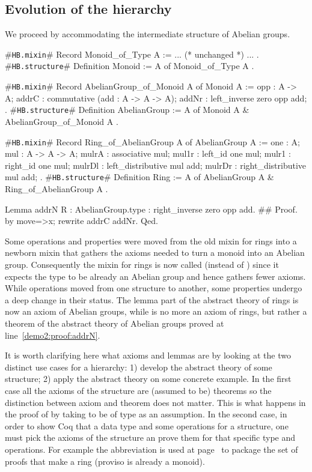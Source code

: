 \documentclass[a4paper,UKenglish,cleveref, autoref]{lipics-v2019}
\newcommand{\mixin}{mixin}
\newcommand{\phantterm}{abbreviation}
\newcommand{\hbmixin}{{\tt\color{dkgreen}HB.mixin}}
\newcommand{\hbstructure}{{\tt\color{dkgreen}HB.structure}}
\theoremstyle{implem}
\theoremstyle{implem}
\theoremstyle{command}
\theoremstyle{commands}
\begin{document}
\subsection{Evolution of the hierarchy}\label{subsec:evolution}

We proceed by accommodating the intermediate
structure of Abelian groups.

\begin{coqcode}
#\hbmixin{}# Record Monoid_of_Type A := { ... (* unchanged *) ... }.
#\hbstructure{}# Definition Monoid := { A of Monoid_of_Type A }.

#\hbmixin{}# Record AbelianGroup_of_Monoid A of Monoid A := {
  opp : A -> A;
  addrC : commutative (add : A -> A -> A);
  addNr : left_inverse zero opp add;
}.
#\hbstructure{}# Definition AbelianGroup := { A of Monoid A & AbelianGroup_of_Monoid A }.

#\hbmixin{}# Record Ring_of_AbelianGroup A of AbelianGroup A := {
  one : A;
  mul : A -> A -> A;
  mulrA : associative mul;
  mul1r : left_id one mul;              mulr1 : right_id one mul;
  mulrDl : left_distributive mul add;   mulrDr : right_distributive mul add;
}.
#\hbstructure{}# Definition Ring := { A of AbelianGroup A & Ring_of_AbelianGroup A }.

Lemma addrN {R : AbelianGroup.type} : right_inverse zero opp add.               #\label{demo2:proof:addrN}#
Proof. by move=>x; rewrite addrC addNr. Qed.
\end{coqcode}

Some operations and properties were moved from the old \mixin{} for rings
into a newborn \mixin{}  that gathers the
axioms needed to turn a monoid into an Abelian group. Consequently the \mixin{}
for rings is now called  (instead of )
since it expects the type  to be already an Abelian group and hence
gathers fewer axioms.
While operations moved from one structure to another, some properties
undergo a deep change in their status.
The lemma  part of the abstract theory of
rings is now an axiom of Abelian groups, while  is no more
an axiom of rings, but rather a theorem of the abstract theory of Abelian
groups proved at line~\ref{demo2:proof:addrN}.

It is worth clarifying here what axioms and lemmas are by looking at the
two distinct use cases for a hierarchy: 1) develop the abstract theory of some
structure; 2) apply the abstract theory on some concrete example.
In the first case
all the axioms of the structure are (assumed to be) theorems so the distinction
between axiom and theorem does not matter. This is what happens
in the proof of  by taking  to be of type
 as an assumption.
In the second case,
in order to show Coq that a data type and some operations for a structure,
one must pick the axioms of the structure an prove them for that specific
type and operations. For example the  \phantterm{}
is used at page~\pageref{demo:theory:z:ring:axioms} to package the set
of proofs that make  a ring (proviso  is already a monoid).
\end{document}
